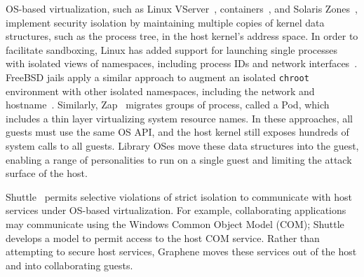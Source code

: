 
OS-based virtualization, such as 
Linux VServer~\citep{vserver},  containers~\citep{bhattiprolu08containers},
and Solaris Zones~\citep{price04zones},
implement security isolation by maintaining multiple copies of kernel data structures,
such as the process tree,
in the host kernel's address space.
In order to facilitate sandboxing, 
Linux has added support for launching single processes
with isolated views of namespaces, including process IDs and network interfaces~\citep{lwn-namespaces}.
FreeBSD jails apply a similar approach to augment an isolated {\tt chroot} environment
with other isolated namespaces, including the network and hostname~\citep{jails}.
Similarly, Zap~\citep{osman02zap} migrates groups of process, called a Pod,
which includes a thin layer virtualizing system resource names.
In these approaches, all guests must use the same OS API, and the host kernel
still exposes hundreds of system calls to all guests.
Library OSes move these data structures into the guest, enabling
a range of personalities to run on a single guest and limiting the attack surface
of the host.


Shuttle~\citep{shan12shuttle} permits selective violations of strict isolation
to communicate with host services 
under OS-based virtualization.
For example, collaborating applications may communicate using the Windows Common Object Model (COM);
Shuttle develops a model to permit access to the host COM service.
Rather than attempting to secure host services,
Graphene moves these services out of the host
and into collaborating guests.


